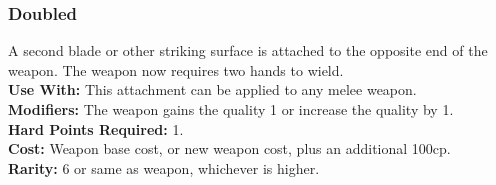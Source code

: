 \subsubsection{Doubled}
A second blade or other striking surface is attached to the
opposite end of the weapon. The weapon now requires
two hands to wield.\\
\textbf{Use With:} This attachment can be applied to any
    melee weapon.\\
\textbf{Modifiers:} The weapon gains the   quality 1 or increase the  quality by 1.\\
\textbf{Hard Points Required:} 1.\\
\textbf{Cost:} Weapon base cost, or new weapon cost, plus an additional 100cp.\\
\textbf{Rarity:} 6 or same as weapon, whichever is higher.\\
